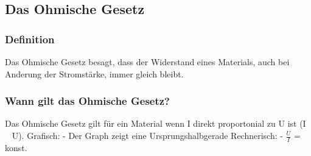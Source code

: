 \documentclass[../../main.tex]{subfiles}
\begin{document}
\subsection{Das Ohmische Gesetz}
\subsubsection{Definition}
Das Ohmische Gesetz besagt, dass der Widerstand eines Materials, auch bei Anderung der Stromstärke, immer gleich bleibt.
\subsubsection{Wann gilt das Ohmische Gesetz?}
Das Ohmische Gesetz gilt für ein Material wenn I direkt proportonial zu U ist (I ~ U).
Grafisch:
    - Der Graph zeigt eine Ursprungshalbgerade
Rechnerisch:
    - $\frac{U}{I}$ = konst.
\end{document}
